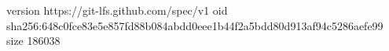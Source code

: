 version https://git-lfs.github.com/spec/v1
oid sha256:648c0fce83e5e857fd88b084abdd0eee1b44f2a5bdd80d913af94c5286aefe99
size 186038
